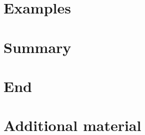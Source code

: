 \documentclass[]{beamer}
\begin{document}
\section{Examples}
\transition


\section{Summary}
\transition


\section*{End}
\thankyou


\appendix
{}


\beginbackup
\section{Additional material}
\transitionsubsec


\backupend
\end{document}
